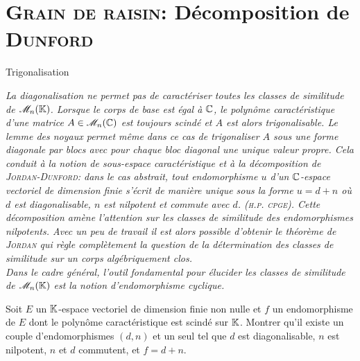 \section{\textsc{Grain de raisin:} Décomposition de \textsc{Dunford}}

\begin{Large}
    Trigonalisation
\end{Large}

\textsl{La diagonalisation ne permet pas de caractériser toutes les classes de similitude de $\mathscr{M}_n(\mathbb{K})$. Lorsque le corps de base est égal à $\mathbb{C}$, le polynôme caractéristique d'une matrice $A \in \mathscr{M}_n(\mathbb{C})$ est toujours scindé et $A$ est alors trigonalisable. Le lemme des noyaux permet même dans ce cas de trigonaliser $A$ sous une forme diagonale par blocs avec pour chaque bloc diagonal une unique valeur propre. Cela conduit à la notion de sous-espace caractéristique et à la décomposition de \textsc{Jordan}-\textsc{Dunford}: dans le cas abstrait, tout endomorphisme $u$ d'un $\mathbb{C}$-espace vectoriel de dimension finie s'écrit de manière unique sous la forme $u = d + n$ où $d$ est diagonalisable, $n$ est nilpotent et commute avec $d$. (\textsc{h.p. cpge}). Cette décomposition amène l'attention sur les classes de similitude des endomorphismes nilpotents. Avec un peu de travail il est alors possible d'obtenir le théorème de \textsc{Jordan} qui règle complètement la question de la détermination des classes de similitude sur un corps algébriquement clos. \\
Dans le cadre général, l'outil fondamental pour élucider les classes de similitude de $\mathscr{M}_n(\mathbb{K})$ est la notion d'endomorphisme cyclique.
}

\begin{exercice}
    Soit $E$ un $\mathbb{K}$-espace vectoriel de dimension finie non nulle et $f$ un endomorphisme de $E$ dont le polynôme caractéristique est scindé sur $\mathbb{K}$.
    Montrer qu’il existe un couple d’endomorphismes $(d, n)$ et un seul tel que $d$ est diagonalisable, $n$ est nilpotent, $n$ et $d$ commutent, et $f = d + n$.
\end{exercice}


